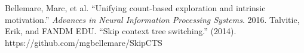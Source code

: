 \documentclass{article}
\begin{document}
\begin{thebibliography}{plain}
Bellemare, Marc, et al. ``Unifying count-based exploration and intrinsic motivation.'' \textit{Advances in Neural Information Processing Systems}. 2016.
Talvitie, Erik, and FANDM EDU. ``Skip context tree switching.'' (2014).
https://github.com/mgbellemare/SkipCTS
\end{thebibliography}
\end{document}
